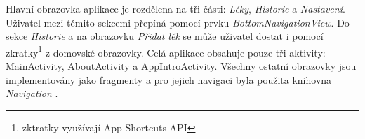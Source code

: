 \documentclass[../TakeYourPill.tex]{subfiles}
\begin{document}
Hlavní obrazovka aplikace je rozdělena na tři části: \textit{Léky}, \textit{Historie} a \textit{Nastavení}. Uživatel mezi těmito sekcemi přepíná pomocí prvku \textit{BottomNavigationView}. Do sekce \textit{Historie} a na obrazovku \textit{Přidat lék} se může uživatel dostat i pomocí zkratky\footnote{zktratky využívají App Shortcuts API} z domovské obrazovky. Celá aplikace obsahuje pouze tři aktivity: MainActivity, AboutActivity a AppIntroActivity. Všechny ostatní obrazovky jsou implementovány jako fragmenty a pro jejich navigaci byla použita knihovna \textit{Navigation} \cite{navigation}.
\end{document}
